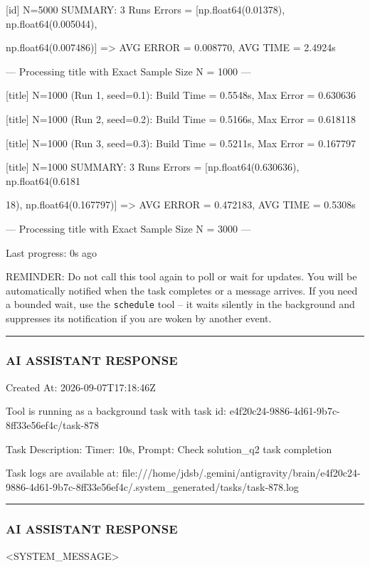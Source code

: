 \documentclass[11pt,a4paper]{article}
\begin{document}
{[id] N=5000 SUMMARY: 3 Runs Errors = [np.float64(0.01378), np.float64(0.005044),

np.float64(0.007486)] => AVG ERROR = 0.008770, AVG TIME = 2.4924s

--- Processing title with Exact Sample Size N = 1000 ---

[title] N=1000 (Run 1, seed=0.1): Build Time = 0.5548s, Max Error = 0.630636

[title] N=1000 (Run 2, seed=0.2): Build Time = 0.5166s, Max Error = 0.618118

[title] N=1000 (Run 3, seed=0.3): Build Time = 0.5211s, Max Error = 0.167797

[title] N=1000 SUMMARY: 3 Runs Errors = [np.float64(0.630636), np.float64(0.6181

18), np.float64(0.167797)] => AVG ERROR = 0.472183, AVG TIME = 0.5308s

--- Processing title with Exact Sample Size N = 3000 ---


Last progress: 0s ago



REMINDER: Do not call this tool again to poll or wait for updates. You will be automatically notified when the task completes or a message arrives. If you need a bounded wait, use the \texttt{schedule} tool -- it waits silently in the background and suppresses its notification if you are woken by another event.


\hrule

\subsubsection{AI ASSISTANT RESPONSE}

Created At: 2026-09-07T17:18:46Z

Tool is running as a background task with task id: e4f20c24-9886-4d61-9b7c-8ff33e56ef4c/task-878

Task Description: Timer: 10s, Prompt: Check solution\_q2 task completion

Task logs are available at: file:///home/jdsb/.gemini/antigravity/brain/e4f20c24-9886-4d61-9b7c-8ff33e56ef4c/.system\_generated/tasks/task-878.log


\hrule

\subsubsection{AI ASSISTANT RESPONSE}

<SYSTEM\_MESSAGE>

}
\end{document}
